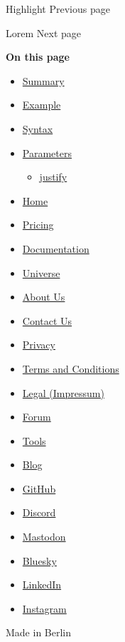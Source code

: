 { Highlight } { Previous page }

\href{/docs/reference/text/lorem/}{\pandocbounded{}}

{ Lorem } { Next page }

\textbf{On this page}

\begin{itemize}
\tightlist
\item
  \hyperref[summary]{Summary}
\item
  \hyperref[example]{Example}
\item
  \hyperref[syntax]{Syntax}
\item
  \hyperref[parameters]{Parameters}

  \begin{itemize}
  \tightlist
  \item
    \hyperref[parameters-justify]{justify}
  \end{itemize}
\end{itemize}

\begin{itemize}
\tightlist
\item
  \href{/}{Home}
\item
  \href{/pricing/}{Pricing}
\item
  \href{/docs/}{Documentation}
\item
  \href{/universe/}{Universe}
\item
  \href{/about/}{About Us}
\item
  \href{/contact/}{Contact Us}
\item
  \href{/privacy/}{Privacy}
\item
  \href{https://typst.app/terms}{Terms and Conditions}
\item
  \href{/legal/}{Legal (Impressum)}
\end{itemize}

\begin{itemize}
\tightlist
\item
  \href{https://forum.typst.app}{Forum}
\item
  \href{/tools/}{Tools}
\item
  \href{/blog/}{Blog}
\item
  \href{https://github.com/typst/}{GitHub}
\item
  \href{https://discord.gg/2uDybryKPe}{Discord}
\item
  \href{https://mastodon.social/@typst}{Mastodon}
\item
  \href{https://bsky.app/profile/typst.app}{Bluesky}
\item
  \href{https://www.linkedin.com/company/typst/}{LinkedIn}
\item
  \href{https://instagram.com/typstapp/}{Instagram}
\end{itemize}

Made in Berlin
